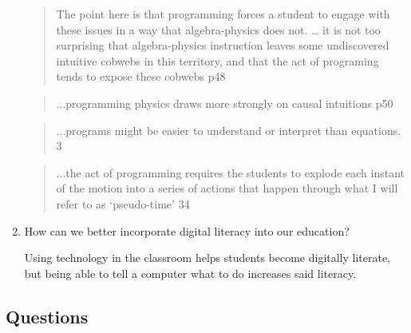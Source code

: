 \documentclass[12pt]{article}
\begin{document}
\begin{enumerate}
	\begin{quotation}
			The point here is that programming forces a student to engage with these issues in a way that algebra-physics does not. … it is not too surprising that algebra-physics instruction leaves some undiscovered intuitive cobwebs in this territory, and that the act of programing tends to expose these cobwebs 	p48\cite{sherin}
	\end{quotation}
	\begin{quotation}
		...programming physics draws more strongly on causal intuitions	p50\cite{sherin}
	\end{quotation}
	\begin{quotation}
		...programs might be easier to understand or interpret than equations. 	3\cite{sherin}
	\end{quotation}
	\begin{quotation}
		...the act of programming requires the students to explode each instant of the motion into a series of actions that happen through what I will refer to as ‘pseudo-time’	34\cite{sherin}
	\end{quotation}

	\item How can we better incorporate digital literacy into our education?
    
    Using technology in the classroom helps students become digitally literate, but being able to tell a computer what to do increases said literacy. 
    
\end{enumerate}
\subsection{Questions}

\end{document}
